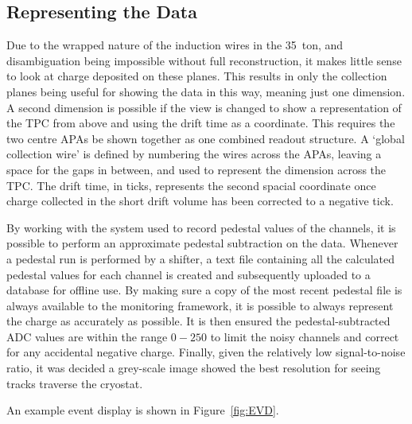 \subsection{Representing the Data}\label{RepresentingEVDData}

Due to the wrapped nature of the induction wires in the 35~ton, and disambiguation being impossible without full reconstruction, it makes little sense to look at charge deposited on these planes.  This results in only the collection planes being useful for showing the data in this way, meaning just one dimension.  A second dimension is possible if the view is changed to show a representation of the TPC from above and using the drift time as a coordinate.  This requires the two centre APAs be shown together as one combined readout structure.  A `global collection wire' is defined by numbering the wires across the APAs, leaving a space for the gaps in between, and used to represent the dimension across the TPC.  The drift time, in ticks, represents the second spacial coordinate once charge collected in the short drift volume has been corrected to a negative tick.

By working with the system used to record pedestal values of the channels, it is possible to perform an approximate pedestal subtraction on the data.  Whenever a pedestal run is performed by a shifter, a text file containing all the calculated pedestal values for each channel is created and subsequently uploaded to a database for offline use.  By making sure a copy of the most recent pedestal file is always available to the monitoring framework, it is possible to always represent the charge as accurately as possible.  It is then ensured the pedestal-subtracted ADC values are within the range $0-250$ to limit the noisy channels and correct for any accidental negative charge.  Finally, given the relatively low signal-to-noise ratio, it was decided a grey-scale image showed the best resolution for seeing tracks traverse the cryostat.

An example event display is shown in Figure~\ref{fig:EVD}.

